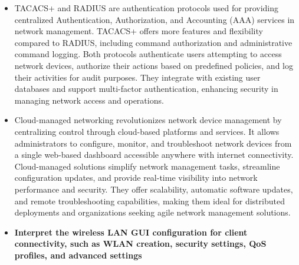 \documentclass{article}
\begin{document}
\begin{itemize}
	\item[] TACACS+ and RADIUS are authentication protocols used for providing centralized Authentication, Authorization, and Accounting (AAA) services in network management. TACACS+ offers more features and flexibility compared to RADIUS, including command authorization and administrative command logging. Both protocols authenticate users attempting to access network devices, authorize their actions based on predefined policies, and log their activities for audit purposes. They integrate with existing user databases and support multi-factor authentication, enhancing security in managing network access and operations.
	\item[] Cloud-managed networking revolutionizes network device management by centralizing control through cloud-based platforms and services. It allows administrators to configure, monitor, and troubleshoot network devices from a single web-based dashboard accessible anywhere with internet connectivity. Cloud-managed solutions simplify network management tasks, streamline configuration updates, and provide real-time visibility into network performance and security. They offer scalability, automatic software updates, and remote troubleshooting capabilities, making them ideal for distributed deployments and organizations seeking agile network management solutions.
  
  \item \textbf{Interpret the wireless LAN GUI configuration for client connectivity, such as WLAN creation, security settings, QoS profiles, and advanced settings}\\
\end{itemize}
\end{document}
